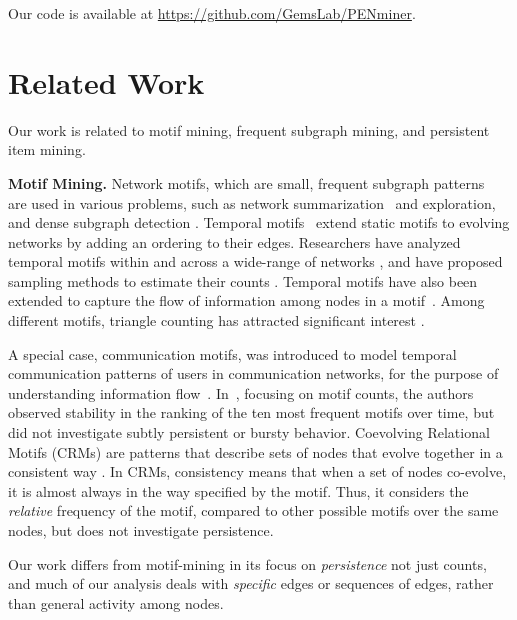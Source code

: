 \documentclass[sigconf]{acmart}
\begin{document}
{Our code is available at {\href{https://github.com/GemsLab/PENminer}{https://github.com/GemsLab/PENminer}}}.




\section{Related Work}
\label{sec:related}

Our work is related to motif mining, frequent subgraph mining, and persistent item mining. 

\vspace{0.1cm}
\noindent
\textbf{Motif Mining.}
\label{subsec:motif}
Network motifs, which are small, frequent subgraph patterns~\cite{Milo2002NetworkMS} 
are used in various problems, such as network summarization~\cite{LiuSDK18-survey} and exploration, and dense subgraph detection \cite{specgreedy}. 
Temporal motifs~\cite{kovanen2011temporal} extend static motifs to evolving networks by adding an ordering to their edges. 
Researchers have analyzed temporal motifs within and across a wide-range of networks \cite{paranjape2017motifs}, and have proposed 
sampling methods to estimate their counts \cite{Liu2019SamplingMF}. Temporal motifs have also been extended to capture the flow of information among nodes in a motif~\cite{Kosyfaki2018FlowMI}. Among different motifs, triangle counting has
attracted significant interest \cite{stefani2017triest}. 


A special case, communication motifs, was introduced to model temporal communication patterns of users in communication networks, for the purpose of understanding information flow~\cite{Zhao2010CommunicationMA,gurukar2015commit}. In~\cite{Zhao2010CommunicationMA}, focusing on motif counts, the authors observed stability in the ranking of the ten most frequent motifs over time, but did not investigate subtly persistent or bursty behavior. 
Coevolving Relational Motifs (CRMs) are patterns that describe sets of nodes that evolve together in a consistent way \cite{ahmed2015algorithms}. In CRMs, consistency means that when a set of nodes co-evolve, it is almost always in the way specified by the motif. Thus, it considers the \emph{relative} frequency of the motif, compared to other possible motifs over the same nodes, but does not investigate persistence. 

Our work differs from motif-mining in its focus on \emph{persistence} not  just counts, and much of our analysis deals with \emph{specific} edges or sequences of edges, rather than general activity among nodes. 
\end{document}
